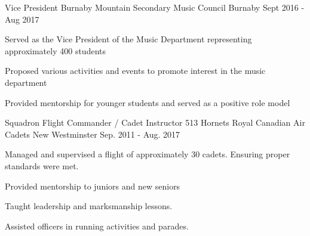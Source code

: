 


\begin{cventries}

  \cventry
    {Vice President} %
    {Burnaby Mountain Secondary Music Council} %
    {Burnaby} %
    {Sept 2016 - Aug 2017} %
    {
      \begin{cvitems} %
        \item {Served as the Vice President of the Music Department representing approximately 400 students}
        \item {Proposed various activities and events to promote interest in the music department}
        \item {Provided mentorship for younger students and served as a positive role model}
      \end{cvitems}
    }
  \cventry
    {Squadron Flight Commander / Cadet Instructor} %
    {513 Hornets Royal Canadian Air Cadets} %
    {New Westminster} %
    {Sep. 2011 - Aug. 2017} %
    {
      \begin{cvitems} %
        \item {Managed and supervised a flight of approximately 30 cadets. Ensuring proper standards were met.}
        \item {Provided mentorship to juniors and new seniors}
        \item {Taught leadership and marksmanship lessons.}
        \item {Assisted officers in running activities and parades.}
      \end{cvitems}
    }

\end{cventries}

